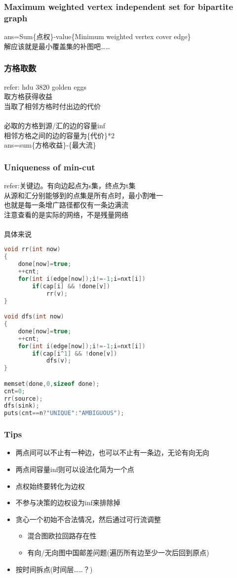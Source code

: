 \subsubsection{Maximum weighted vertex independent set for bipartite graph}
ans=Sum\{点权\}-value\{Minimum weighted vertex cover edge\}\\
解应该就是最小覆盖集的补图吧……
\subsubsection{方格取数}
refer: hdu 3820 golden eggs\\
取方格获得收益\\
当取了相邻方格时付出边的代价\\
\\
必取的方格到源/汇的边的容量inf\\
相邻方格之间的边的容量为\{代价\}*2\\
ans=sum\{方格收益\}-\{最大流\}
\subsubsection{Uniqueness of min-cut}
refer:关键边。有向边起点为s集，终点为t集\\
从源和汇分别能够到的点集是所有点时，最小割唯一\\
也就是每一条增广路径都仅有一条边满流\\
注意查看的是实际的网络，不是残量网络\\
\\
具体来说
\begin{lstlisting}[language=C++]
void rr(int now)
{
    done[now]=true;
    ++cnt;
    for(int i(edge[now]);i!=-1;i=nxt[i])
        if(cap[i] && !done[v])
            rr(v);
}

void dfs(int now)
{
    done[now]=true;
    ++cnt;
    for(int i(edge[now]);i!=-1;i=nxt[i])
        if(cap[i^1] && !done[v])
            dfs(v);
}

memset(done,0,sizeof done);
cnt=0;
rr(source);
dfs(sink);
puts(cnt==n?"UNIQUE":"AMBIGUOUS");
\end{lstlisting}
\subsubsection{Tips}
\begin{itemize}
\item 两点间可以不止有一种边，也可以不止有一条边，无论有向无向
\item 两点间容量inf则可以设法化简为一个点
\item 点权始终要转化为边权
\item 不参与决策的边权设为inf来排除掉
\item 贪心一个初始不合法情况，然后通过可行流调整
\begin{itemize}
\item 混合图欧拉回路存在性
\item 有向/无向图中国邮差问题(遍历所有边至少一次后回到原点)
\end{itemize}
\item 按时间拆点(时间层……？)
\end{itemize}
